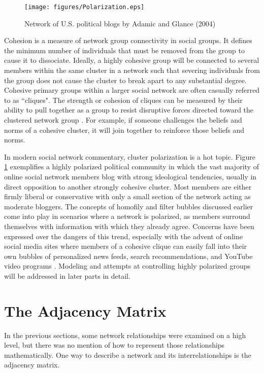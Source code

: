 {\begin{figure}[!htbp] \centering
  \texttt{[image: figures/Polarization.eps]}
  \caption{Network of U.S. political blogs by Adamic and Glance (2004) \cite{adamic2005political}}
  \label{fig:Polarization}
\end{figure}

Cohesion is a measure of network group connectivity in social groups. It defines the minimum number of individuals that must be removed from the group to cause it to dissociate. Ideally, a highly cohesive group will be connected to several members within the same cluster in a network such that severing individuals from the group does not cause the cluster to break apart to any substantial degree. Cohesive primary groups within a larger social network are often casually referred to as ``cliques". The strength or cohesion of cliques can be measured by their ability to pull together as a group to resist disruptive forces directed toward the clustered network group \cite{yang2016social}. For example, if someone challenges the beliefs and norms of a cohesive cluster, it will join together to reinforce those beliefs and norms.

In modern social network commentary, cluster polarization is a hot topic. Figure \ref{fig:Polarization} exemplifies a highly polarized political community in which the vast majority of online social network members blog with strong ideological tendencies, usually in direct opposition to another strongly cohesive cluster. Most members are either firmly liberal or conservative with only a small section of the network acting as moderate bloggers. The concepts of homofily and filter bubbles discussed earlier come into play in scenarios where a network is polarized, as members surround themselves with information with which they already agree. Concerns have been expressed over the dangers of this trend, especially with the advent of online social media sites where members of a cohesive clique can easily fall into their own bubbles of personalized news feeds, search recommendations, and YouTube video programs \cite{nikolov2015measuring}. Modeling and attempts at controlling highly polarized groups will be addressed in later parts in detail.

\section{The Adjacency Matrix}
In the previous sections, some network relationships were examined on a high level, but there was no mention of how to represent those relationships mathematically. One way to describe a network and its interrelationships is the adjacency matrix. 

}
